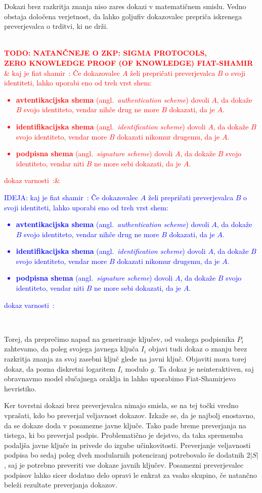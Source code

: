 \documentclass[isrm2, tisk]{fmfdelo}
\newcommand{\todo}[2][]{%
    \textcolor{red}{%
        \\ \textbf{\uppercase{todo: #2}}%
        \\%
        \ifx&#1&%
        \else%
            \textcolor{blue}{\uppercase{ideja:} #1}%
            \\%
        \fi%
    }%
}
\begin{document}
\begin{opomba}
    Dokazi brez razkritja znanja niso zares dokazi v matematičnem smislu. Vedno obstaja določena verjetnost, 
    da lahko goljufiv dokazovalec prepriča iskrenega preverjevalca o trditvi, ki ne drži.
\end{opomba}

\todo[
kaj je fiat shamir~\cite{fiat1987heuristic}:  
Če dokazovalec $A$ želi prepričati preverjevalca $B$ o svoji identiteti, lahko uporabi eno od treh
vrst shem:
\begin{itemize}
    \item \textbf{avtentikacijska shema} (angl.\ \textit{authentication scheme}) dovoli $A$, da dokaže
        $B$ svojo identiteto, vendar nihče drug ne more $B$ dokazati, da je $A$.
    \item \textbf{identifikacijska shema} (angl.\ \textit{identification scheme}) dovoli $A$, da dokaže
        $B$ svojo identiteto, vendar more $B$ dokazati nikomur drugemu, da je $A$.
    \item \textbf{podpisna shema} (angl.\ \textit{signature scheme}) dovoli $A$, da dokaže
        $B$ svojo identiteto, vendar niti $B$ ne more sebi dokazati, da je $A$.
\end{itemize}
dokaz varnosti~\cite{pointcheval1996forking}:]
{natančneje o zkp: sigma protocols, \\ zero knowledge proof (of knowledge) fiat-shamir}

Torej, da preprečimo napad na generiranje ključev, od vsakega podpisnika $P_i$ zahtevamo, da poleg 
svojega javnega ključa $I_i$ objavi tudi dokaz o znanju brez razkritja znanja za svoj zasebni ključ 
glede na javni ključ. Objaviti mora torej dokaz, da pozna diskretni logaritem $I_i$ modulo $g$. 
Ta dokaz je neinteraktiven, saj obravnavmo model slučajnega oraklja in lahko uporabimo Fiat-Shamirjevo 
hevristiko.

Ker tovrstni dokazi brez preverjevalca nimajo smisla, se na tej točki vredno vprašati, kdo bo preverjal 
veljavnost dokazov. Izkaže se, da je najbolj enostavno, da se dokaze doda v posamezne javne ključe. 
Tako pade breme preverjanja na tistega, ki bo preverjal podpis. Problematično je dejstvo, da taka 
sprememba podaljša javne ključe in privede do izgube učinkovitosti. Preverjanje veljavnosti podpisa 
bo sedaj poleg dveh modularnih potenciranj potrebovalo še dodatnih $2|S|$, saj je potrebno preveriti 
vse dokaze javnih ključev. Posamezni preverjevalec podpisov lahko sicer dodatno delo opravi le enkrat 
za vsako skupino, če natančno beleži rezultate preverjanja dokazov.
\end{document}
